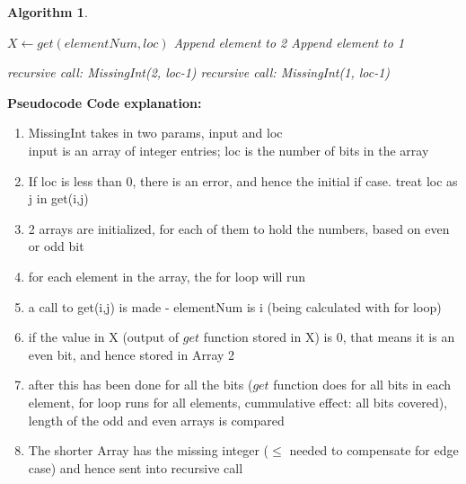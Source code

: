 \documentclass[11pt]{article}
\newtheorem{algorithm}{Algorithm}
\begin{document}
\begin{enumerate}
\begin{enumerate}
\begin{algorithm}
\begin{algorithmic}
                \STATE $X \leftarrow get(elementNum, loc)$
                    Append element to 2
                    \ELSE
                    Append element to 1
                    \ENDIF
                \ENDFOR
                
                \RETURN recursive call: MissingInt(2, loc-1)
                \ELSE
                \RETURN recursive call: MissingInt(1, loc-1)
                \ENDIF
                
            \end{algorithmic}
        \end{algorithm}
        \textbf{Pseudocode Code explanation:}
        \begin{enumerate}
            \item MissingInt takes in two params, input and loc\\
            input is an array of integer entries; loc is the number of bits in the array
            \item If loc is less than 0, there is an error, and hence the initial if case. treat loc as j in get(i,j)
            \item 2 arrays are initialized, for each of them to hold the numbers, based on even or odd bit
            \item for each element in the array, the for loop will run
            \item a call to get(i,j) is made - elementNum is i (being calculated with for loop)
            \item if the value in X (output of $get$ function stored in X) is 0, that means it is an even bit, and hence stored in Array 2
            \item after this has been done for all the bits ($get$ function does for all bits in each element, for loop runs for all elements, cummulative effect: all bits covered), length of the odd and even arrays is compared
            \item The shorter Array has the missing integer ($\leq$ needed to compensate for edge case) and hence sent into recursive call
        \end{enumerate}


\end{enumerate}
\end{enumerate}
\end{document}
